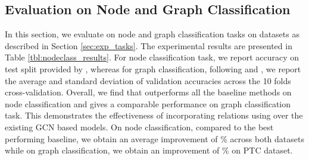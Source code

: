 \documentclass{article} \usepackage{iclr2020_conference,times}
\begin{document}
\vspace{-1mm}
\subsection{Evaluation on Node and Graph Classification}
\label{sec:res_node_nmt}
\vspace{-1mm}
In this section, we evaluate \method{} on node and graph classification tasks on datasets as described in Section \ref{sec:exp_tasks}. The experimental results are presented in Table \ref{tbl:nodeclass_results}. For node classification task, we report accuracy on test split provided by \cite{node_class_splits}, whereas for graph classification, following \cite{graph_datasets} and \cite{gin}, we report the average and standard deviation of validation accuracies across the 10 folds cross-validation.  Overall, we find that \method{} outperforms all the baseline methods on node classification and gives a comparable performance on graph classification task. This demonstrates the effectiveness of incorporating relations using \method{} over the existing GCN based models. On node classification, compared to the best performing baseline, we obtain an average improvement of \% across both datasets while on graph classification, we obtain an improvement of \% on PTC dataset.
\end{document}
